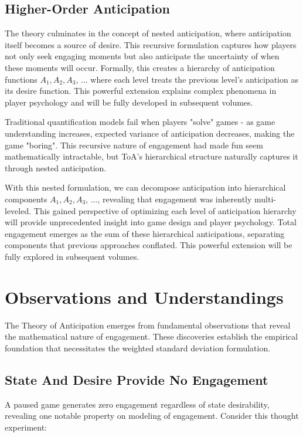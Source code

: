 \documentclass{article}
\begin{document}
\subsection{Higher-Order Anticipation}
The theory culminates in the concept of nested anticipation, where anticipation itself becomes a source of desire. This recursive formulation captures how players not only seek engaging moments but also anticipate the uncertainty of when these moments will occur.
Formally, this creates a hierarchy of anticipation functions $A_1, A_2, A_3$, ... where each level treats the previous level's anticipation as its desire function. This powerful extension explains complex phenomena in player psychology and will be fully developed in subsequent volumes.

Traditional quantification models fail when players "solve" games - as game understanding increases, expected variance of anticipation decreases, making the game "boring". This recursive nature of engagement had made fun seem mathematically intractable, but ToA's hierarchical structure naturally captures it through nested anticipation.

With this nested formulation, we can decompose anticipation into hierarchical components $A_1, A_2, A_3$, ..., revealing that engagement was inherently multi-leveled.
This gained perspective of optimizing each level of anticipation hierarchy will provide unprecedented insight into game design and player psychology. Total engagement emerges as the sum of these hierarchical anticipations, separating components that previous approaches conflated. This powerful extension will be fully explored in subsequent volumes.

\section{Observations and Understandings}

The Theory of Anticipation emerges from fundamental observations that reveal the mathematical nature of engagement. These discoveries establish the empirical foundation that necessitates the weighted standard deviation formulation.

\subsection{State And Desire Provide No Engagement}

A paused game generates zero engagement regardless of state desirability, revealing one notable property on modeling of engagement. Consider this thought experiment:
\end{document}
